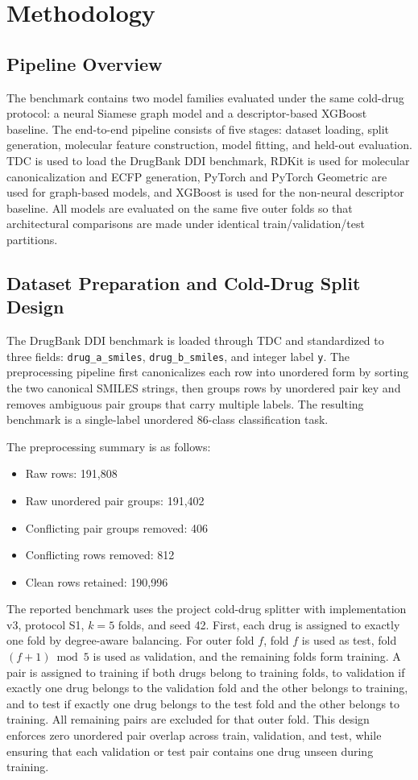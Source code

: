 \chapter{Methodology}

\section{Pipeline Overview}
The benchmark contains two model families evaluated under the same cold-drug protocol: a neural Siamese graph model and a descriptor-based XGBoost baseline. The end-to-end pipeline consists of five stages: dataset loading, split generation, molecular feature construction, model fitting, and held-out evaluation. TDC is used to load the DrugBank DDI benchmark, RDKit is used for molecular canonicalization and ECFP generation, PyTorch and PyTorch Geometric are used for graph-based models, and XGBoost is used for the non-neural descriptor baseline. All models are evaluated on the same five outer folds so that architectural comparisons are made under identical train/validation/test partitions.

\section{Dataset Preparation and Cold-Drug Split Design}
The DrugBank DDI benchmark is loaded through TDC and standardized to three fields: \texttt{drug\_a\_smiles}, \texttt{drug\_b\_smiles}, and integer label \texttt{y}. The preprocessing pipeline first canonicalizes each row into unordered form by sorting the two canonical SMILES strings, then groups rows by unordered pair key and removes ambiguous pair groups that carry multiple labels. The resulting benchmark is a single-label unordered 86-class classification task.

The preprocessing summary is as follows:
\begin{itemize}
\item Raw rows: 191{,}808
\item Raw unordered pair groups: 191{,}402
\item Conflicting pair groups removed: 406
\item Conflicting rows removed: 812
\item Clean rows retained: 190{,}996
\end{itemize}

The reported benchmark uses the project cold-drug splitter with implementation v3, protocol S1, \(k=5\) folds, and seed 42. First, each drug is assigned to exactly one fold by degree-aware balancing. For outer fold \(f\), fold \(f\) is used as test, fold \((f+1)\bmod 5\) is used as validation, and the remaining folds form training. A pair is assigned to training if both drugs belong to training folds, to validation if exactly one drug belongs to the validation fold and the other belongs to training, and to test if exactly one drug belongs to the test fold and the other belongs to training. All remaining pairs are excluded for that outer fold. This design enforces zero unordered pair overlap across train, validation, and test, while ensuring that each validation or test pair contains one drug unseen during training.


